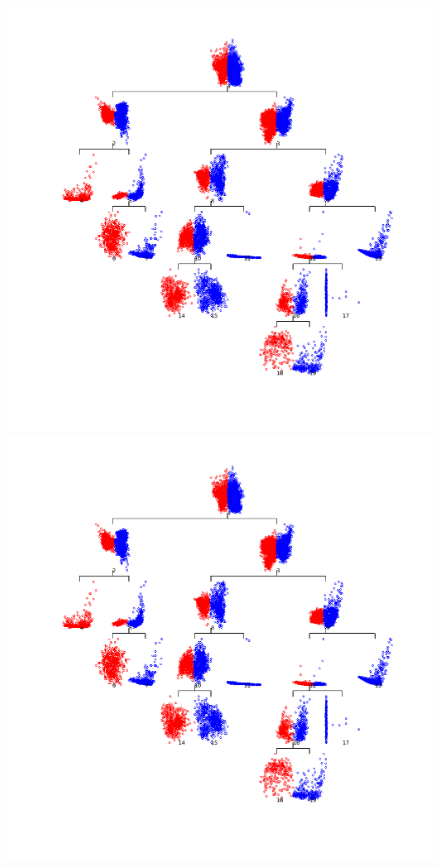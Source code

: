 \documentclass{book}
\begin{document}
%
\begin{figure}
%
\begin{latexonly}
%
\begin{center}
	\includegraphics[scale=0.3]{figures/ncut1.png}
%
\end{center}
%
\end{latexonly}
%
\begin{htmlonly}
%
\includegraphics[scale=0.7]{figures/ncut1.png}

\end{htmlonly}
\end{figure}
\end{document}
